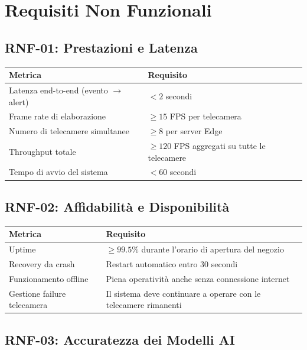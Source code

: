 \documentclass[a4paper, 12pt]{article}
\begin{document}
\section{Requisiti Non Funzionali}

\subsection{RNF-01: Prestazioni e Latenza}

\begin{tabularx}{\textwidth}{lL}
    \toprule
    \textbf{Metrica} & \textbf{Requisito} \\
    \midrule
    Latenza end-to-end (evento $\rightarrow$ alert) & $< 2$ secondi \\
    Frame rate di elaborazione & $\geq 15$ FPS per telecamera \\
    Numero di telecamere simultanee & $\geq 8$ per server Edge \\
    Throughput totale & $\geq 120$ FPS aggregati su tutte le telecamere \\
    Tempo di avvio del sistema & $< 60$ secondi \\
    \bottomrule
\end{tabularx}

\subsection{RNF-02: Affidabilità e Disponibilità}

\begin{tabularx}{\textwidth}{lL}
    \toprule
    \textbf{Metrica} & \textbf{Requisito} \\
    \midrule
    Uptime & $\geq 99.5\%$ durante l'orario di apertura del negozio \\
    Recovery da crash & Restart automatico entro 30 secondi \\
    Funzionamento offline & Piena operatività anche senza connessione internet \\
    Gestione failure telecamera & Il sistema deve continuare a operare con le telecamere rimanenti \\
    \bottomrule
\end{tabularx}

\subsection{RNF-03: Accuratezza dei Modelli AI}
\end{document}
